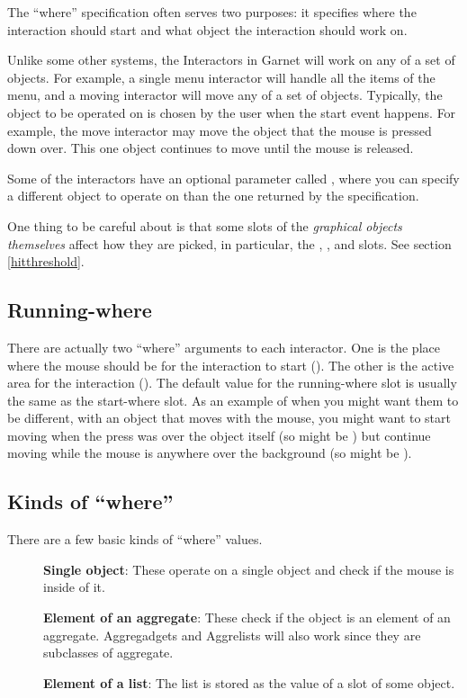 The ``where'' specification often serves two purposes: it specifies where
the interaction should start and what object the interaction should work
on.

Unlike some other systems, the Interactors in Garnet will work on any of a
set of objects.  For example, a single menu interactor will handle all the
items of the menu, and a moving interactor will move any of a set of
objects.  Typically, the object to be operated on is chosen by the user
when the start event happens.  For example, the move interactor may move
the object that the mouse is pressed down over.  This one object continues
to move until the mouse is released.

Some of the interactors have an
optional parameter called , where you can specify a
different object to operate on than the one returned by the
 specification.

One thing to be careful about is that some slots of the {\it graphical
objects themselves} affect how they are picked, in particular, the
, , and 
slots.  See section \ref{hitthreshold}.

\subsection{Running-where}
\label{runningwhere}

There are actually two ``where'' arguments to each interactor.  One is the
place where the mouse should be for the interaction to start
().  The other is
the active area for the interaction ().  The default
value for the running-where slot is usually the same as the start-where
slot.  As an example of when you might want them to be different,
with an object that moves with the mouse,
you might want to start moving when the press was over the object itself
(so  might be )
but continue moving while the mouse is anywhere over the background
(so  might be ).

\subsection{Kinds of ``where''}

There are a few basic kinds of ``where'' values.
\begin{description}
\item[] {\bf Single object}: These operate on a single object and check if the mouse
is inside of it.

\item[] {\bf Element of an aggregate}: These check if the object is an element of an
aggregate.  Aggregadgets and Aggrelists will also work since they are
subclasses of aggregate.

\item[] {\bf Element of a list}: The list is stored as the value of a slot of some
object.
\end{description}

